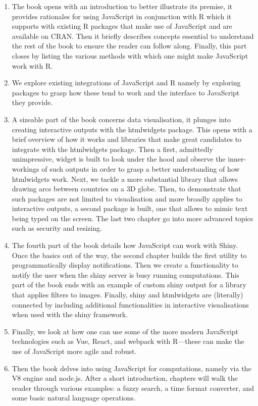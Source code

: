 \documentclass[
]{krantz}
\begin{document}
\begin{enumerate}
\def\labelenumi{\arabic{enumi}.}
\item
  The book opens with an introduction to better illustrate its premise, it provides rationales for using JavaScript in conjunction with R which it supports with existing R packages that make use of JavaScript and are available on CRAN. Then it briefly describes concepts essential to understand the rest of the book to ensure the reader can follow along. Finally, this part closes by listing the various methods with which one might make JavaScript work with R.
\item
  We explore existing integrations of JavaScript and R namely by exploring packages to grasp how these tend to work and the interface to JavaScript they provide.
\item
  A sizeable part of the book concerns data visualisation, it plunges into creating interactive outputs with the htmlwidgets package. This opens with a brief overview of how it works and libraries that make great candidates to integrate with the htmlwidgets package. Then a first, admittedly unimpressive, widget is built to look under the hood and observe the inner-workings of such outputs in order to grasp a better understanding of how htmlwidgets work. Next, we tackle a more substantial library that allows drawing arcs between countries on a 3D globe. Then, to demonstrate that such packages are not limited to visualisation and more broadly applies to interactive outputs, a second package is built, one that allows to mimic text being typed on the screen. The last two chapter go into more advanced topics such as security and resizing.
\item
  The fourth part of the book details how JavaScript can work with Shiny. Once the basics out of the way, the second chapter builds the first utility to programmatically display notifications. Then we create a functionality to notify the user when the shiny server is busy running computations. This part of the book ends with an example of custom shiny output for a library that applies filters to images. Finally, shiny and htmlwidgets are (literally) connected by including additional functionalities in interactive visualisations when used with the shiny framework.
\item
  Finally, we look at how one can use some of the more modern JavaScript technologies such as Vue, React, and webpack with R---these can make the use of JavaScript more agile and robust.
\item
  Then the book delves into using JavaScript for computations, namely via the V8 engine and node.js. After a short introduction, chapters will walk the reader through various examples: a fuzzy search, a time format converter, and some basic natural language operations.

\end{enumerate}
\end{document}
